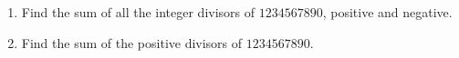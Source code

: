 \begin{enumerate}
\item[(a)] Find the sum of all the integer divisors of $1234567890$, positive and negative.
\item[(b)] Find the sum of the positive divisors of $1234567890$.
\end{enumerate}
